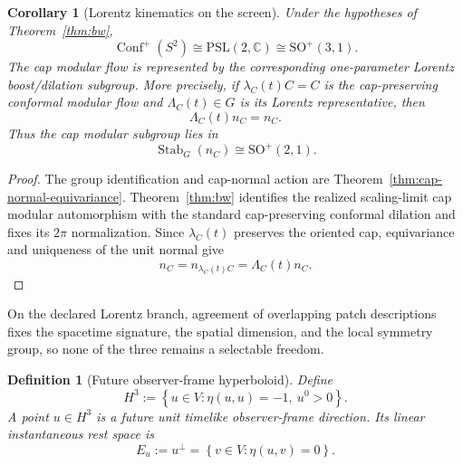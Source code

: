\documentclass[11pt]{article}
\newtheorem{corollary}[theorem]{Corollary}
\newtheorem{definition}[theorem]{Definition}
\begin{document}
\begin{corollary}[Lorentz kinematics on the screen]\label{cor:lorentz}
Under the hypotheses of Theorem~\ref{thm:bw},
\[
\operatorname{Conf}^{+}(S^2)\cong \mathrm{PSL}(2,\mathbb C)
\cong \mathrm{SO}^{+}(3,1).
\]
The cap modular flow is represented by the corresponding one-parameter
Lorentz boost/dilation subgroup. More precisely, if \(\lambda_C(t)C=C\) is
the cap-preserving conformal modular flow and \(\Lambda_C(t)\in G\) is its
Lorentz representative, then
\[
\boxed{
\Lambda_C(t)n_C=n_C.
}
\]
Thus the cap modular subgroup lies in
\[
\operatorname{Stab}_G(n_C)\cong\mathrm{SO}^{+}(2,1).
\]
\end{corollary}

\begin{proof}
The group identification and cap-normal action are
Theorem~\ref{thm:cap-normal-equivariance}. Theorem~\ref{thm:bw} identifies
the realized scaling-limit cap modular automorphism with the standard
cap-preserving conformal dilation and fixes its \(2\pi\) normalization. Since
\(\lambda_C(t)\) preserves the oriented cap, equivariance and uniqueness of
the unit normal give
\[
n_C=n_{\lambda_C(t)C}=\Lambda_C(t)n_C.
\]
\end{proof}

On the declared Lorentz branch, agreement of overlapping patch descriptions
fixes the spacetime signature, the spatial dimension, and the local symmetry
group, so none of the three remains a selectable freedom.

\begin{definition}[Future observer-frame hyperboloid]\label{def:h3-observer-frames}
Define
\[
H^3:=\left\{u\in V:\eta(u,u)=-1,\ u^0>0\right\}.
\]
A point \(u\in H^3\) is a future unit timelike observer-frame direction. Its
linear instantaneous rest space is
\[
E_u:=u^\perp=\left\{v\in V:\eta(u,v)=0\right\}.
\]
\end{definition}
\end{document}
